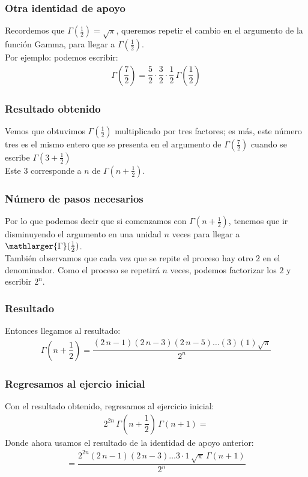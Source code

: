 \documentclass[12pt]{beamer}
\begin{document}
\begin{frame}
\frametitle{Otra identidad de apoyo}
Recordemos que $\Gamma(\frac{1}{2}) = \sqrt{\pi}$, \pause queremos repetir el cambio en el argumento de la función Gamma, para llegar a $\Gamma(\frac{1}{2})$.
\\
\bigskip
\pause
Por ejemplo: podemos escribir:
\begin{align*}
\Gamma \left( \dfrac{7}{2} \right) = \dfrac{5}{2} \cdot \dfrac{3}{2} \cdot \dfrac{1}{2} \, \Gamma \left( \dfrac{1}{2} \right)
\end{align*}
\end{frame}
\begin{frame}
\frametitle{Resultado obtenido}
Vemos que obtuvimos $\Gamma(\frac{1}{2})$ multiplicado por tres factores; \pause es más, este número tres es el mismo entero que se presenta en el argumento de $\Gamma(\frac{7}{2})$ cuando se escribe $\Gamma(3 + \frac{1}{2})$
\\
\bigskip
\pause
Este $3$ corresponde a $n$ de $\Gamma \left(n + \frac{1}{2}\right)$.
\end{frame}
\begin{frame}
\frametitle{Número de pasos necesarios}
Por lo que podemos decir que si comenzamos con $\Gamma \left(n + \frac{1}{2}\right)$, tenemos que ir disminuyendo el argumento en una unidad $n$ veces para llegar a $\mathlarger{\Gamma}(\frac{1}{2})$.
\\
\bigskip
\pause
También observamos que cada vez que se repite el proceso hay otro $2$ en el denominador. Como el proceso se repetirá $n$ veces, podemos factorizar los $2$ y escribir $2^{n}$.
\end{frame}
\begin{frame}
\frametitle{Resultado}
Entonces llegamos al resultado:
\begin{align*}
\Gamma\left( n + \dfrac{1}{2} \right) = \dfrac{(2 \, n {-} 1)(2 \, n {-} 3)(2 \, n {-} 5) \ldots (3)(1)\sqrt{\pi}}{2^{n}}
\end{align*}    
\end{frame}
\begin{frame}
\frametitle{Regresamos al ejercio inicial}
Con el resultado obtenido, regresamos al ejercicio inicial:
\begin{align*}
2^{2n} \, \Gamma \left( n + \dfrac{1}{2} \right) \, \Gamma(n + 1) =
\end{align*}    
\pause
Donde ahora usamos el resultado de la identidad de apoyo anterior:
\pause
\begin{align*}
= \dfrac{2^{2n} (2 \, n {-} 1)(2 \, n - 3) \ldots 3 \cdot 1 \, \sqrt{\pi} \, \Gamma(n + 1)}{2^{n}}
\end{align*}
\end{frame}
\end{document}
